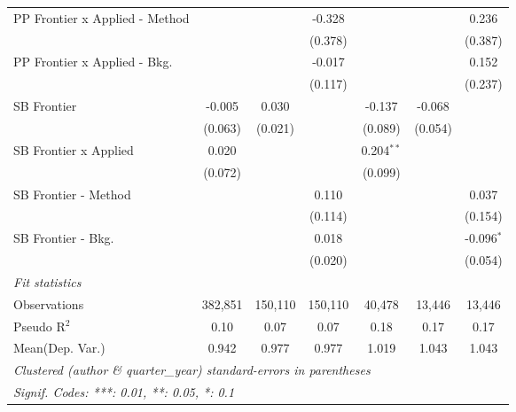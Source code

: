 \begin{tabular}{lcccccc}
   PP Frontier x Applied - Method &              &               & -0.328         &               &         & 0.236\\   
                                  &              &               & (0.378)        &               &         & (0.387)\\   
   PP Frontier x Applied - Bkg.   &              &               & -0.017         &               &         & 0.152\\   
                                  &              &               & (0.117)        &               &         & (0.237)\\   
   SB Frontier                    & -0.005       & 0.030         &                & -0.137        & -0.068  &   \\   
                                  & (0.063)      & (0.021)       &                & (0.089)       & (0.054) &   \\   
   SB Frontier x Applied          & 0.020        &               &                & 0.204$^{**}$  &         &   \\   
                                  & (0.072)      &               &                & (0.099)       &         &   \\   
   SB Frontier - Method           &              &               & 0.110          &               &         & 0.037\\   
                                  &              &               & (0.114)        &               &         & (0.154)\\   
   SB Frontier - Bkg.             &              &               & 0.018          &               &         & -0.096$^{*}$\\   
                                  &              &               & (0.020)        &               &         & (0.054)\\   
   \midrule
   \emph{Fit statistics}\\
   Observations                   & 382,851      & 150,110       & 150,110        & 40,478        & 13,446  & 13,446\\  
   Pseudo R$^2$                   & 0.10         & 0.07          & 0.07           & 0.18          & 0.17    & 0.17\\  
Mean(Dep. Var.) & 0.942 & 0.977 & 0.977 & 1.019 & 1.043 & 1.043 \\
   \midrule \midrule
   \multicolumn{7}{l}{\emph{Clustered (author \& quarter\_year) standard-errors in parentheses}}\\
   \multicolumn{7}{l}{\emph{Signif. Codes: ***: 0.01, **: 0.05, *: 0.1}}\\
\end{tabular}
\par\endgroup

